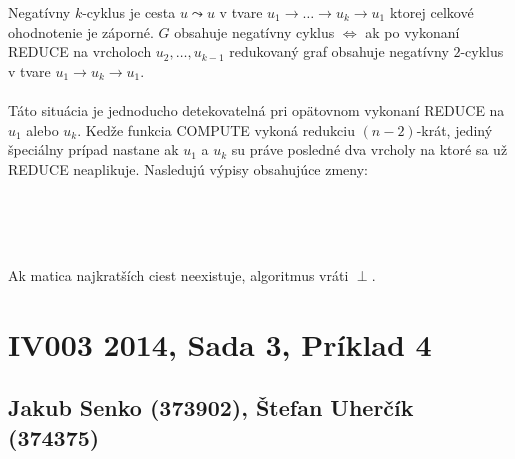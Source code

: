 \documentclass[paper=a4, fontsize=11pt]{scrartcl} %
\numberwithin{equation}{section} %
\numberwithin{figure}{section} %
\numberwithin{table}{section} %
\begin{document}
Negatívny $k$-cyklus je cesta $u \leadsto u$ v tvare $u_1 \to \dots \to u_k \to u_1$ ktorej celkové ohodnotenie je záporné. $G$ obsahuje negatívny cyklus $\iff$ ak po vykonaní REDUCE na vrcholoch $u_2, \dots, u_{k-1}$ redukovaný graf obsahuje negatívny $2$-cyklus v tvare $u_1 \to u_k \to u_1$.\\
\ \\
Táto situácia je jednoducho detekovatelná pri opätovnom vykonaní REDUCE na $u_1$ alebo $u_k$. Kedže funkcia COMPUTE vykoná redukciu $(n-2)$-krát, jediný špeciálny prípad nastane ak $u_1$ a $u_k$ su práve posledné dva vrcholy na ktoré sa už REDUCE neaplikuje. Nasledujú výpisy obsahujúce zmeny:\\
\ \\
\begin{algorithmic}[1]
        \State{$\vdots$}
                \State \Return{$\perp$}
            \EndIf    
        \EndIf
        \State{$\vdots$}
    \EndFunction
\end{algorithmic}
\ \\
\begin{algorithmic}[1]
                \State \Return{$\perp$}
            \EndIf
        \EndFor
            \State \Return{$\perp$}
        \EndIf
        \State{$\vdots$}
    \EndFunction
\end{algorithmic}
\ \\
Ak matica najkratších ciest neexistuje, algoritmus vráti $\perp$.

\pagebreak


\section*{IV003 2014, Sada 3, Príklad 4}
\subsection*{Jakub Senko (373902), Štefan Uherčík (374375)}
\end{document}
